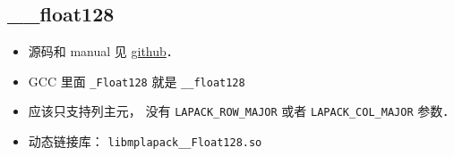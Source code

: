 
\begin{issues}
\issueDraft
\end{issues}


\subsection{__float128}
\begin{itemize}
\item 源码和 manual 见 \href{https://github.com/nakatamaho/mplapack}{github}．
\item GCC 里面 \verb|_Float128| 就是 \verb|__float128|
\item 应该只支持列主元， 没有 \verb|LAPACK_ROW_MAJOR| 或者 \verb|LAPACK_COL_MAJOR| 参数．
\item 动态链接库： \verb|libmplapack__Float128.so|
\end{itemize}

